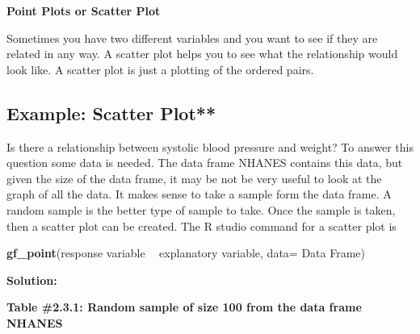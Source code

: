 \documentclass[
]{book}
\newenvironment{Shaded}{\begin{snugshade}}{\end{snugshade}}
\newcommand{\DataTypeTok}[1]{\textcolor[rgb]{0.13,0.29,0.53}{#1}}
\newcommand{\DecValTok}[1]{\textcolor[rgb]{0.00,0.00,0.81}{#1}}
\newcommand{\KeywordTok}[1]{\textcolor[rgb]{0.13,0.29,0.53}{\textbf{#1}}}
\newcommand{\NormalTok}[1]{#1}
\newcommand{\OperatorTok}[1]{\textcolor[rgb]{0.81,0.36,0.00}{\textbf{#1}}}
\newcommand{\StringTok}[1]{\textcolor[rgb]{0.31,0.60,0.02}{#1}}
\begin{document}
\textbf{Point Plots or Scatter Plot}

Sometimes you have two different variables and you want to see if they are related in any way. A scatter plot helps you to see what the relationship would look like. A scatter plot is just a plotting of the
ordered pairs.

\hypertarget{example-scatter-plot}{%
\subsection{Example: Scatter Plot**}\label{example-scatter-plot}}

Is there a relationship between systolic blood pressure and weight? To answer this question some data is needed. The data frame NHANES contains this data, but given the size of the data frame, it may be not be very useful to look at the graph of all the data. It makes sense to take a sample form the data frame. A random sample is the better type of sample to take. Once the sample is taken, then a scatter plot can be created. The R studio command for a scatter plot is

\begin{Shaded}
\begin{Highlighting}[]
\KeywordTok{gf_point}\NormalTok{(response variable }\OperatorTok{~}\StringTok{ }\NormalTok{explanatory variable, }\DataTypeTok{data=}\NormalTok{ Data Frame)}
\end{Highlighting}
\end{Shaded}

\textbf{Solution:}

\textbf{Table \#2.3.1: Random sample of size 100 from the data frame NHANES}

\begin{Shaded}
\end{Shaded}
\end{document}
